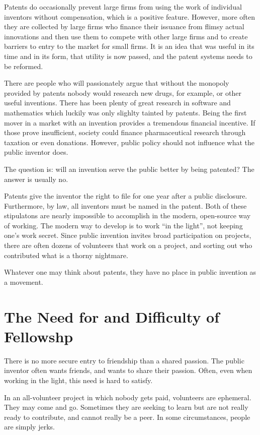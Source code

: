 \documentclass[
	fontsize=10pt, %
	twoside=false, %
	secnumdepth=1, %
]{kaobook}
\begin{document}
Patents do occasionally prevent large firms from using the
work of individual inventors without compensation, which
is a positive feature. However, more often they are collected
by large firms who finance their issuance from flimsy actual
innovations and then use them to compete with other large firms
and to create barriers to entry to the market for small firms.
It is an idea that was useful in its time and in its form,
that utility is now passed, and the patent systems needs
to be reformed.

There are people who will passionately argue that without
the monopoly provided by patents nobody would research new
drugs, for example, or other useful inventions.
There has been plenty of great research in software and
mathematics which luckily was only slighlty tainted by patents.
Being the first mover in a market with an invention provides
a tremendous financial incentive.
If those prove insufficient, society could finance
pharmaceutical research through taxation or
even donations.
However, public policy should not influence
what the public inventor does.

The question is: will an invention serve the public better
by being patented? The answer is usually no.

Patents give the inventor the right to file for one year
after a public disclosure. Furthermore, by law,
all inventors must be named in the patent. Both
of these stipulatons are nearly impossible to accomplish
in the modern, open-source way of working.
The modern way to develop is to work ``in the light'',
not keeping one's work secret.
Since public invention invites broad participation on projects,
there are often dozens of volunteers that work on a project,
and sorting out who contributed what is a thorny nightmare.

Whatever one may think about patents, they have no
place in public invention as a movement.

\section{The Need for and Difficulty of Fellowshp}

There is no more secure entry to friendship than a shared passion.
The public inventor often wants friends, and wants to share
their passion.
Often, even when working in the light, this need
is hard to satisfy.

In an all-volunteer project in which nobody gets paid,
volunteers are ephemeral. They may come and go.
Sometimes they are seeking to learn but are not
really ready to contribute, and cannot really
be a peer.
In some circumstances, people are simply jerks.
\end{document}
